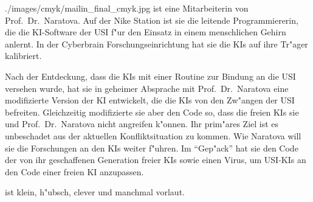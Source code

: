 
\begin{sideimagebox}[r]{0.6}{./images/cmyk/mailin_final_cmyk.jpg}{\ml}
    \ml{} ist eine Mitarbeiterin von Prof.~Dr.~Naratova. Auf der Nike Station ist sie die leitende Programmiererin, die die KI-Software der USI f"ur den Einsatz in einem menschlichen Gehirn anlernt. In der Cyberbrain Forschungseinrichtung hat sie die KIs auf ihre Tr"ager kalibriert.

    Nach der Entdeckung, dass die KIs mit einer Routine zur Bindung an die USI versehen wurde, hat sie in geheimer Absprache mit Prof.~Dr.~Naratova eine modifizierte Version der KI entwickelt, die die KIs von den Zw"angen der USI befreiten. Gleichzeitig modifizierte sie aber den Code so, dass die freien KIs sie und Prof.~Dr.~Naratova nicht angreifen k"onnen. Ihr prim"ares Ziel ist es unbeschadet aus der aktuellen Konfliktsituation zu kommen. Wie Naratova will sie die Forschungen an den KIs weiter f"uhren. Im ``Gep"ack'' hat sie den Code der von ihr geschaffenen Generation freier KIs sowie einen Virus, um USI-KIs an den Code einer freien KI anzupassen.

    \ml{} ist klein, h"ubsch, clever und manchmal vorlaut.
\end{sideimagebox}
